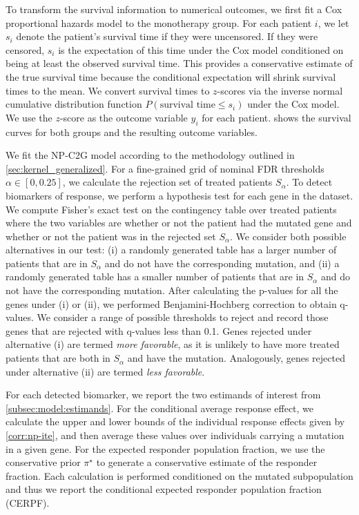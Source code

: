 To transform the survival information to numerical outcomes, we first fit a Cox proportional hazards model to the monotherapy group. For each patient $i$, we let $s_i$ denote the patient's survival time if they were uncensored. If they were censored, $s_i$ is the expectation of this time under the Cox model conditioned on being at least the observed survival time. This provides a conservative estimate of the true survival time because the conditional expectation will shrink survival times to the mean. We convert survival times to $z$-scores via the inverse normal cumulative distribution function $P(\text{survival time} \leq s_i)$ under the Cox model. We use the $z$-score as the outcome variable $y_i$ for each patient.  shows the survival curves for both groups and the resulting outcome variables.


We fit the NP-C2G model according to the methodology outlined in \cref{sec:kernel_generalized}. For a fine-grained grid of nominal FDR thresholds $\alpha \in [0, 0.25]$, we calculate the rejection set of treated patients $S_\alpha$. To detect biomarkers of response, we perform a hypothesis test for each gene in the dataset. We compute Fisher's exact test on the contingency table over treated patients where the two variables are whether or not the patient had the mutated gene and whether or not the patient was in the rejected set $S_\alpha$. We consider both possible alternatives in our test: (i) a randomly generated table has a larger number of patients that are in $S_\alpha$ and do not have the corresponding mutation, and (ii) a randomly generated table has a smaller number of patients that are in $S_\alpha$ and do not have the corresponding mutation. After calculating the p-values for all the genes under (i) or (ii), we performed Benjamini-Hochberg correction to obtain q-values. We consider a range of possible thresholds to reject and record those genes that are rejected with q-values less than 0.1. Genes rejected under alternative (i) are termed \emph{more favorable}, as it is unlikely to have more treated patients that are both in $S_\alpha$ and have the mutation. Analogously, genes rejected under alternative (ii) are termed \emph{less favorable}.

For each detected biomarker, we report the two estimands of interest from \cref{subsec:model:estimands}. For the conditional average response effect, we calculate the upper and lower bounds of the individual response effects given by \cref{corr:np-ite}, and then average these values over individuals carrying a mutation in a given gene. For the expected responder population fraction, we use the conservative prior $\pi^\star$ to generate a conservative estimate of the responder fraction. Each calculation is performed conditioned on the mutated subpopulation and thus we report the conditional expected responder population fraction (CERPF).

